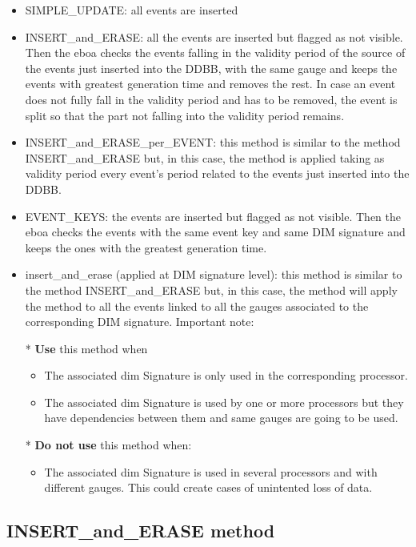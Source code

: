 \begin{itemize}
\item SIMPLE\_UPDATE: all events are inserted
\item INSERT\_and\_ERASE: all the events are inserted but flagged as not visible. Then the \acrshort{eboa} checks the events falling in the validity period of the source of the events just inserted into the DDBB, with the same gauge and keeps the events with greatest generation time and removes the rest. In case an event does not fully fall in the validity period and has to be removed, the event is split so that the part not falling into the validity period remains.
\item INSERT\_and\_ERASE\_per\_EVENT: this method is similar to the method INSERT\_and\_ERASE but, in this case, the method is applied taking as validity period every event's period related to the events just inserted into the DDBB.
\item EVENT\_KEYS: the events are inserted but flagged as not visible. Then the \acrshort{eboa} checks the events with the same event key and same DIM signature and keeps the ones with the greatest generation time.
\item insert\_and\_erase (applied at DIM signature level): this method is similar to the method INSERT\_and\_ERASE but, in this case, the method will apply the method to all the events linked to all the gauges associated to the corresponding DIM signature.
  Important note: \newline
  
  * \textbf{Use} this method when
  \begin{itemize}
  \item The associated \acrshort{dim} Signature is only used in the corresponding processor.
  \item The associated \acrshort{dim} Signature is used by one or more processors but they have dependencies between them and same gauges are going to be used.
  \end{itemize}

  * \textbf{Do not use} this method when:
  \begin{itemize}
  \item The associated \acrshort{dim} Signature is used in several processors and with different gauges. This could create cases of unintented loss of data.
  \end{itemize}
\end{itemize}

\subsection {INSERT\_and\_ERASE method}

